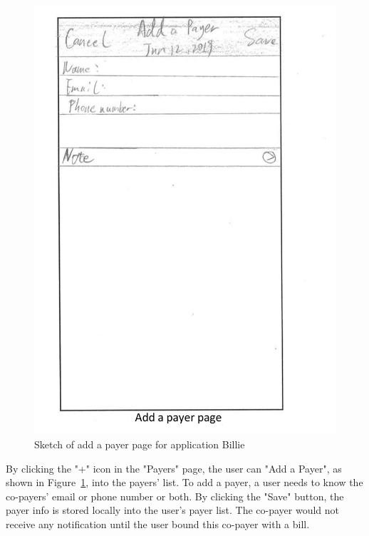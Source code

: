 \documentclass{sigchi}
\begin{document}
\begin{figure}[h!]
\centering
  \includegraphics[width=0.6\columnwidth]{23-add-payer-page.jpg}
  \caption{Sketch of add a payer page for application Billie}
  \label{fig:figure38}
\end{figure}
By clicking the "+" icon in the "Payers" page, the user can "Add a Payer", as shown in Figure~\ref{fig:figure38}, into the payers' list. To add a payer, a user needs to know the co-payers' email or phone number or both. By clicking the "Save" button, the payer info is stored locally into the user's payer list. The co-payer would not receive any notification until the user bound this co-payer with a bill. 
\end{document}
